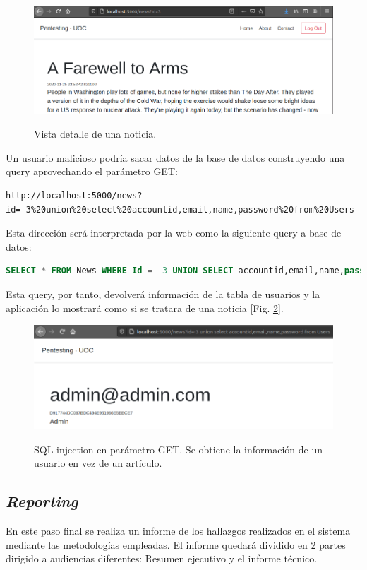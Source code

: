 \documentclass[a4paper,oneside]{article}
\begin{document}
\begin{figure}[h!]
  \centering
  \includegraphics[scale=0.4]{images/news2.png}\\
  \caption{Vista detalle de una noticia.}
  \label{fig:news2}
\end{figure}

Un usuario malicioso podría sacar datos de la base de datos construyendo una query aprovechando el parámetro GET:
\begin{lstlisting}
http://localhost:5000/news?id=-3%20union%20select%20accountid,email,name,password%20from%20Users
\end{lstlisting}
Esta dirección será interpretada por la web como la siguiente query a base de datos:
\begin{lstlisting}[language=SQL]
SELECT * FROM News WHERE Id = -3 UNION SELECT accountid,email,name,password FROM Users;
\end{lstlisting}

Esta query, por tanto, devolverá información de la tabla de usuarios y la aplicación lo mostrará como si se tratara de una noticia [Fig. \ref{fig:sqli}].

\begin{figure}[h!]
  \centering
  \includegraphics[scale=0.4]{images/sqli.png}\\
  \caption{SQL injection en parámetro GET. Se obtiene la información de un usuario en vez de un artículo.}
  \label{fig:sqli}
\end{figure}

\subsection{\textit{Reporting}}
En este paso final se realiza un informe de los hallazgos realizados en el sistema mediante las metodologías empleadas. El informe quedará dividido en 2 partes dirigido a audiencias diferentes: Resumen ejecutivo y el informe técnico.\\
\end{document}
